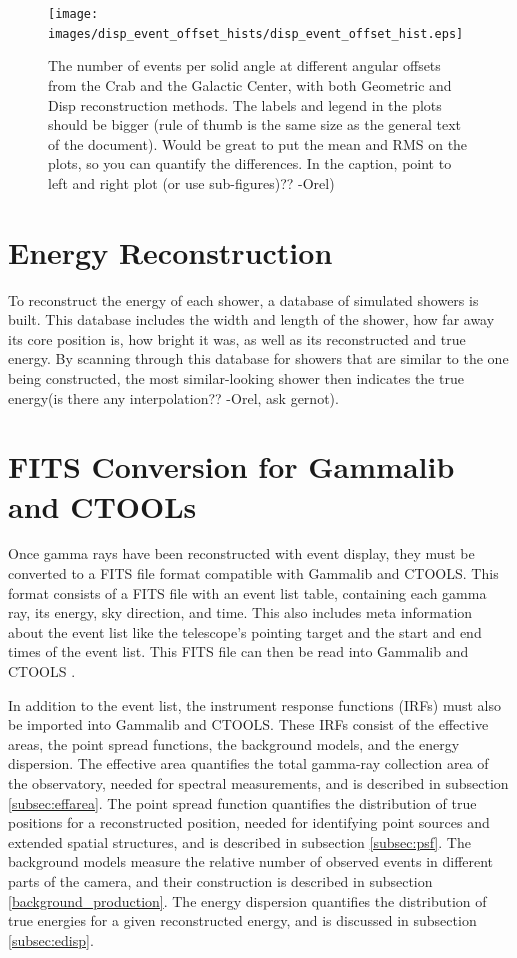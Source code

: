     \begin{figure}[ht]
      \centering
      \texttt{[image: images/disp\_event\_offset\_hists/disp\_event\_offset\_hist.eps]}
      \caption[DISP Offset Improvement]{
        The number of events per solid angle at different angular offsets from the Crab and the Galactic Center, with both Geometric and Disp reconstruction methods.
        The labels and legend in the plots should be bigger (rule of thumb is the same size as the general text of the document). 
        Would be great to put the mean and RMS on the plots, so you can quantify the differences.
        In the caption, point to left and right plot (or use sub-figures)?? -Orel)
      }
      \label{fig:disp_event_offset}
    \end{figure}

\section{Energy Reconstruction}\label{subsec:enrecon}
  To reconstruct the energy of each shower, a database of simulated showers is built.
  This database includes the width and length of the shower, how far away its core position is, how bright it was, as well as its reconstructed and true energy.
  By scanning through this database for showers that are similar to the one being constructed, the most similar-looking shower then indicates the true energy(is there any interpolation?? -Orel, ask gernot).

\section{FITS Conversion for Gammalib and CTOOLs}
  Once gamma rays have been reconstructed with event display, they must be converted to a FITS file format compatible with Gammalib and CTOOLS.
  This format consists of a FITS file with an event list table, containing each gamma ray, its energy, sky direction, and time.
  This also includes meta information about the event list like the telescope's pointing target and the start and end times of the event list.
  This FITS file can then be read into Gammalib and CTOOLS \cite{gammalibctools}.

  In addition to the event list, the instrument response functions (IRFs) must also be imported into Gammalib and CTOOLS.
  These IRFs consist of the effective areas, the point spread functions, the background models, and the energy dispersion.
  The effective area quantifies the total gamma-ray collection area of the observatory, needed for spectral measurements, and is described in subsection \ref{subsec:effarea}.
  The point spread function quantifies the distribution of true positions for a reconstructed position, needed for identifying point sources and extended spatial structures, and is described in subsection \ref{subsec:psf}.
  The background models measure the relative number of observed events in different parts of the camera, and their construction is described in subsection \ref{background_production}.
  The energy dispersion quantifies the distribution of true energies for a given reconstructed energy, and is discussed in subsection \ref{subsec:edisp}.

